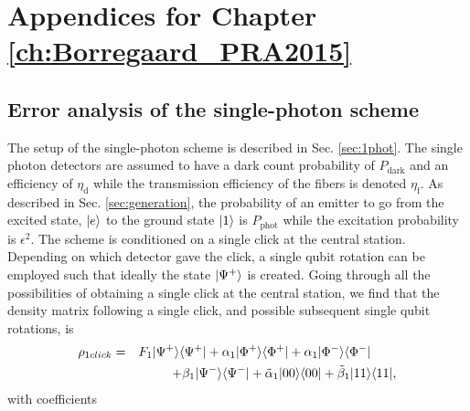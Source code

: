 \chapter{Appendices for Chapter \ref{ch:Borregaard_PRA2015}}
\label{app:Borregaard_PRA2015}

\section{Error analysis of the single-photon scheme} \label{single}

The setup of the single-photon scheme is described in Sec. \ref{sec:1phot}. The
single photon detectors are assumed to have a dark count probability of
$P_{\text{dark}}$ and an efficiency of $\eta_{\text{d}}$ while the transmission
efficiency of the fibers is denoted $\eta_{\text{f}}$.  As described in Sec.
\ref{sec:generation}, the probability of an emitter to go from the excited
state, $| e \rangle$ to the ground state $| 1 \rangle$ is $P_{\text{phot}}$ while the
excitation probability is $\epsilon^{2}$. The scheme is conditioned on a single
click at the central station. Depending on which detector gave the click, a
single qubit rotation can be employed such that ideally the state
$| \Psi^{+} \rangle$ is created. Going through all the possibilities of obtaining a
single click at the central station, we find that the density matrix following a
single click, and possible subsequent single qubit rotations, is
\begin{eqnarray}
\rho_{1click}&=&F_{1}| \Psi^{+} \rangle\langle \Psi^{+} |+
\alpha_{1}| \Phi^{+} \rangle\langle \Phi^{+} |+\alpha_{1}
| \Phi^{-} \rangle\langle \Phi^{-} |\qquad\nonumber
\\
&&+\beta_{1}| \Psi^{-} \rangle\langle \Psi^{-} |+
\tilde{\alpha}_{1}| 00 \rangle\langle 00 |+ \tilde{\beta}_{1}| 11 \rangle\langle 11 |,
\end{eqnarray}
with coefficients
